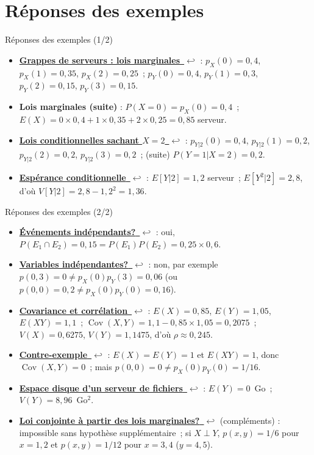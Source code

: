 \documentclass{BeamerTemplate}
\newcommand{\retour}[2]{\hyperlink{#1}{\textbf{#2}~{\color{gray}$\hookleftarrow$}}}
\newcommand{\Cov}{\operatorname{Cov}}
\begin{document}
\section{Réponses des exemples}

\begin{frame}[t,label=rep-ex1]{Réponses des exemples (1/2)}
\footnotesize
\begin{itemize}\itemsep4pt
\item \retour{exgrappes}{Grappes de serveurs : lois marginales} : $p_X(0)=0{,}4$, $p_X(1)=0{,}35$,
$p_X(2)=0{,}25$~; $p_Y(0)=0{,}4$, $p_Y(1)=0{,}3$, $p_Y(2)=0{,}15$, $p_Y(3)=0{,}15$.
\item \textbf{Lois marginales (suite)} : $P(X=0)=p_X(0)=0{,}4$~; $E(X)=0\times0{,}4+1\times0{,}35+2\times0{,}25=0{,}85$ serveur.
\item \retour{excond}{Lois conditionnelles sachant $X=2$} : $p_{Y|2}(0)=0{,}4$, $p_{Y|2}(1)=0{,}2$,
$p_{Y|2}(2)=0{,}2$, $p_{Y|2}(3)=0{,}2$~; (suite) $P(Y=1|X=2)=0{,}2$.
\item \retour{exespcond}{Espérance conditionnelle} : $E[Y|2]=1{,}2$ serveur~;
$E[Y^2|2]=2{,}8$, d'où $V[Y|2]=2{,}8-1{,}2^2=1{,}36$.
\end{itemize}
\end{frame}


\begin{frame}[t,label=rep-ex2]{Réponses des exemples (2/2)}
\footnotesize
\begin{itemize}\itemsep4pt
\item \retour{exevenements}{Événements indépendants?} : oui, $P(E_1\cap E_2)=0{,}15=P(E_1)P(E_2)=0{,}25\times0{,}6$.
\item \retour{exindep}{Variables indépendantes?} : non, par exemple $p(0,3)=0\neq p_X(0)p_Y(3)=0{,}06$
(ou $p(0,0)=0{,}2\neq p_X(0)p_Y(0)=0{,}16$).
\item \retour{excov}{Covariance et corrélation} : $E(X)=0{,}85$, $E(Y)=1{,}05$, $E(XY)=1{,}1$~;
$\Cov(X,Y)=1{,}1-0{,}85\times1{,}05=0{,}2075$~; $V(X)=0{,}6275$, $V(Y)=1{,}1475$, d'où $\rho\approx 0{,}245$.
\item \retour{excontre}{Contre-exemple} : $E(X)=E(Y)=1$ et $E(XY)=1$, donc $\Cov(X,Y)=0$~; mais
$p(0,0)=0\neq p_X(0)p_Y(0)=1/16$.
\item \retour{exdisque}{Espace disque d'un serveur de fichiers} : $E(Y)=0$~Go~; $V(Y)=8{,}96$~Go$^2$.
\item \retour{exautre}{Loi conjointe à partir des lois marginales?} (compléments) : impossible sans
hypothèse supplémentaire~; si $X\perp Y$, $p(x,y)=1/6$ pour $x=1,2$ et $p(x,y)=1/12$ pour $x=3,4$ ($y=4,5$).
\end{itemize}
\end{frame}
\end{document}
